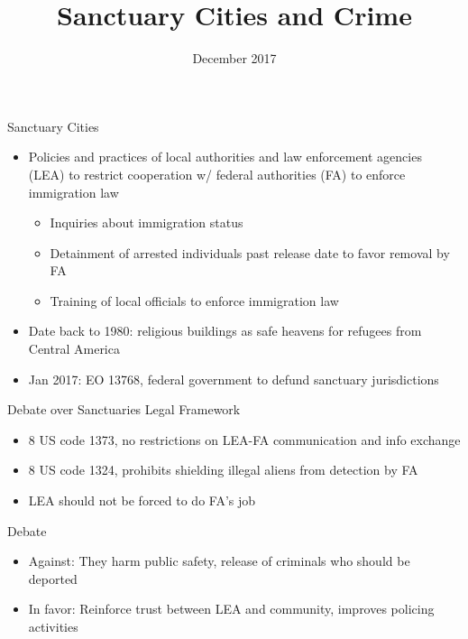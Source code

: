 \documentclass[xcolor=pdftex,dvipsnames,table]{beamer}
\author[Short Name (U ABC)]{%
  \texorpdfstring{%
    \begin{columns}
      \column{.3333\linewidth}
      \centering
      Jaime Arellano-Bover \\ Stanford
      \column{.3333\linewidth}
      \centering
      Barbara Biasi \\ Princeton
    \end{columns}
 }
 {Jaime Arellano-Bover, Barbara Biasi}
}
\begin{document}
\title[Sanctuary cities and crime]{Sanctuary Cities and Crime}

\date{December 2017}

\maketitle

\begin{frame}{Sanctuary Cities}
\begin{itemize}
\item Policies and practices of local authorities and law enforcement agencies (LEA) to restrict cooperation w/ federal authorities (FA) to enforce immigration law\vspace{0.10cm}
\begin{itemize}
\item Inquiries about immigration status\vspace{0.10cm}
\item Detainment of arrested individuals past release date to favor removal by FA\vspace{0.10cm}
\item Training of local officials to enforce immigration law
\end{itemize}\vspace{0.20cm}
\item Date back to 1980: religious buildings as safe heavens for refugees from Central America\vspace{0.20cm}
\item Jan 2017: EO 13768, federal government to defund sanctuary jurisdictions
\end{itemize}
\end{frame}

\begin{frame}{Debate over Sanctuaries}
Legal Framework\vspace{0.20cm}
\begin{itemize}
\item 8 US code 1373, no restrictions on LEA-FA communication and info exchange
\item 8 US code 1324, prohibits shielding illegal aliens from detection by FA
\item  LEA should not be forced to do FA's job
\end{itemize}\vspace{0.20cm}
Debate
\begin{itemize}
\item Against: They harm public safety,  release of criminals who should be deported
\item In favor: Reinforce trust between LEA and community, improves policing activities
\end{itemize}
\end{frame}
\end{document}
